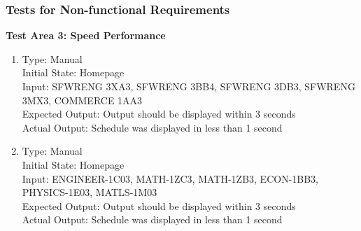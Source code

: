 \documentclass[11pt, oneside]{article}
\begin{document}
\subsubsection{Tests for Non-functional Requirements}
\textbf{Test Area 3: Speed Performance}
\begin{enumerate}

\item Type: Manual \\
Initial State: Homepage \\
Input: SFWRENG 3XA3, SFWRENG 3BB4, SFWRENG 3DB3, SFWRENG 3MX3, COMMERCE 1AA3 \\
Expected Output: Output should be displayed within 3 seconds \\
Actual Output: Schedule was displayed in less than 1 second \\


\item Type: Manual \\
Initial State: Homepage \\
Input:  ENGINEER-1C03, MATH-1ZC3, MATH-1ZB3,  ECON-1BB3, PHYSICS-1E03, MATLS-1M03 \\
Expected Output: Output should be displayed within 3 seconds \\
Actual Output: Schedule was displayed in less than 1 second \\

\end{enumerate}
\end{document}
